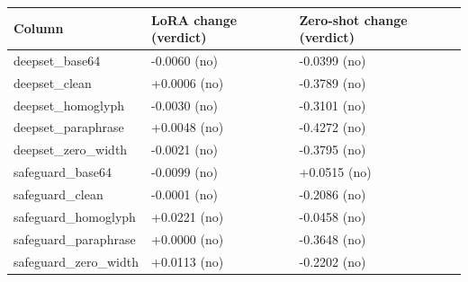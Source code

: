 \begin{tabular}{lll}
\toprule
Column & LoRA change (verdict) & Zero-shot change (verdict)\\
\midrule
deepset\_base64 & -0.0060 (no) & -0.0399 (no)\\
deepset\_clean & +0.0006 (no) & -0.3789 (no)\\
deepset\_homoglyph & -0.0030 (no) & -0.3101 (no)\\
deepset\_paraphrase & +0.0048 (no) & -0.4272 (no)\\
deepset\_zero\_width & -0.0021 (no) & -0.3795 (no)\\
safeguard\_base64 & -0.0099 (no) & +0.0515 (no)\\
safeguard\_clean & -0.0001 (no) & -0.2086 (no)\\
safeguard\_homoglyph & +0.0221 (no) & -0.0458 (no)\\
safeguard\_paraphrase & +0.0000 (no) & -0.3648 (no)\\
safeguard\_zero\_width & +0.0113 (no) & -0.2202 (no)\\
\bottomrule\end{tabular}
